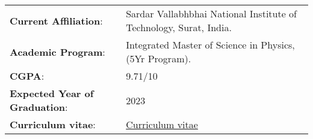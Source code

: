 \begin{tabular}{P{0.25\textwidth} P{0.7\textwidth}}
    \textbf{Current Affiliation}: & Sardar Vallabhbhai National Institute of Technology, Surat, India. \\
    \textbf{Academic Program}: & Integrated Master of Science in Physics, (5Yr Program). \\
    \textbf{CGPA}: & 9.71/10 \\
    \textbf{Expected Year of Graduation}: & 2023 \\
    \textbf{Curriculum vitae}: &  \href{https://github.com/devanshshukla99/devanshshukla99/blob/ff7d9d9bbd5e70345af307bd22dce285b77fc72a/cv/cv_devanshshukla99.pdf}{Curriculum vitae} \\
\end{tabular}

